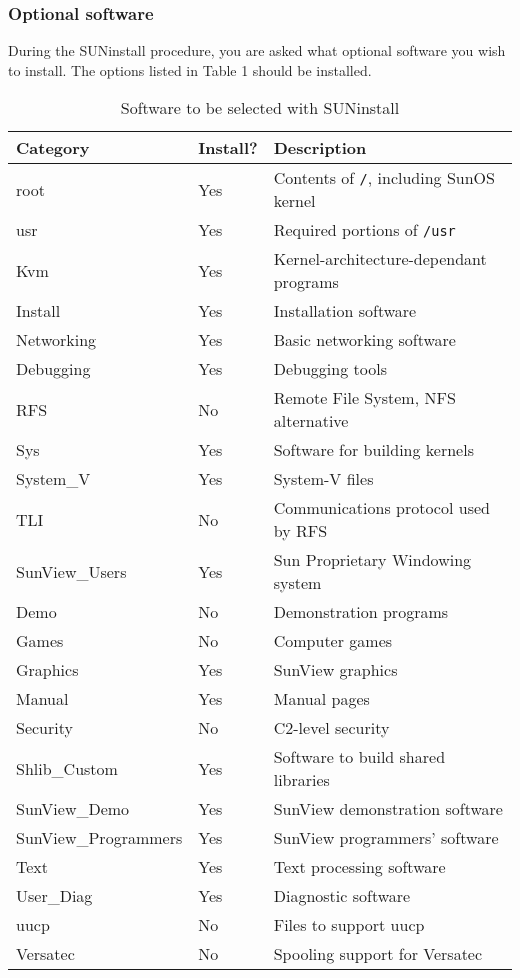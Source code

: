 \subsubsection{Optional software}

During the SUNinstall procedure, you are asked what optional software you
wish to install. The options listed in Table 1 should be installed.

\begin{table}[htb]
\begin{center}
\begin{tabular}{||l|l|l||}
\hline
Category 		& Install? & Description\\
\hline
root			& Yes & Contents of {\tt /}, including SunOS kernel\\
usr			& Yes & Required portions of {\tt /usr}\\
Kvm			& Yes & Kernel-architecture-dependant programs\\
Install			& Yes & Installation software\\
Networking		& Yes & Basic networking software\\
Debugging		& Yes & Debugging tools\\
RFS                     & No  & Remote File System, NFS alternative\\
Sys                     & Yes & Software for building kernels\\
System\_V                & Yes & System-V files\\
TLI                     & No & Communications protocol used by RFS\\
SunView\_Users           & Yes & Sun Proprietary Windowing system\\
Demo                    & No & Demonstration programs\\
Games                   & No & Computer games\\
Graphics                & Yes & SunView graphics\\
Manual                  & Yes & Manual pages\\
Security                & No &  C2-level security\\
Shlib\_Custom            & Yes & Software to build shared libraries\\
SunView\_Demo            & Yes & SunView demonstration software\\
SunView\_Programmers     & Yes & SunView programmers' software\\
Text                    & Yes & Text processing software\\
User\_Diag               & Yes & Diagnostic software\\
uucp    		& No & Files to support uucp\\
Versatec                & No & Spooling support for Versatec\\
\hline
\end {tabular}
\caption{Software to be selected with SUNinstall}
\end{center}
\end {table}

